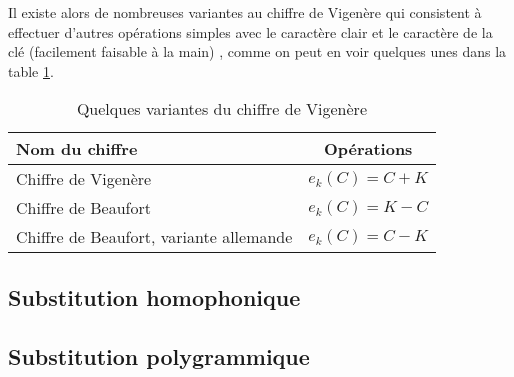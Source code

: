 Il existe alors de nombreuses variantes au chiffre de Vigenère qui
consistent à effectuer d'autres opérations simples avec le caractère
clair et le caractère de la clé (facilement faisable à la main) ,
comme on peut en voir quelques unes dans la table \ref{tab:VariantesVigenere}. 
\begin{table}[h]
  \caption{Quelques variantes du chiffre de Vigenère}
  \label{tab:VariantesVigenere}
  \begin{center}
    \begin{tabular}{|l|c|}
      \hline
      \textbf{Nom du chiffre} & \textbf{Opérations} \\
      \hline
      Chiffre de Vigenère & $e_k(C) = C + K$ \\ 
      \hline
      Chiffre de Beaufort & $e_k(C) = K - C$ \\
      \hline
      Chiffre de Beaufort, variante allemande & $e_k(C) = C - K$ \\
      \hline
    \end{tabular}
  \end{center}
\end{table}

\subsection{Substitution homophonique}
\subsection{Substitution polygrammique}
